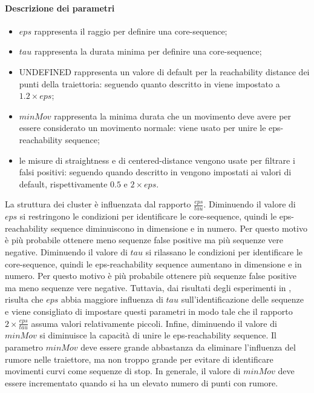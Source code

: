 \documentclass[12pt]{article}
\begin{document}
\paragraph{Descrizione dei parametri}
\begin{itemize}
    \item $eps$ rappresenta il raggio per definire una core-sequence;
    \item $tau$ rappresenta la durata minima per definire una core-sequence;
    \item UNDEFINED rappresenta un valore di default per la reachability distance dei punti della traiettoria: seguendo quanto descritto in \cite{SequenceClustering} viene impostato a $1.2\times eps$;
    \item $minMov$ rappresenta la minima durata che un movimento deve avere per essere considerato un movimento normale: viene usato per unire le eps-reachability sequence;
    \item le misure di straightness e di centered-distance vengono usate per filtrare i falsi positivi: seguendo quando descritto in \cite{SequenceClustering} vengono impostati ai valori di default, rispettivamente $0.5$ e $2\times eps$.
\end{itemize}
La struttura dei cluster è influenzata dal rapporto $\frac{eps}{tau}$.
Diminuendo il valore di $eps$ si restringono le condizioni per identificare le core-sequence, quindi le eps-reachability sequence diminuiscono in dimensione e in numero.
Per questo motivo è più probabile ottenere meno sequenze false positive ma più sequenze vere negative.
Diminuendo il valore di $tau$ si rilassano le condizioni per identificare le core-sequence, quindi  le eps-reachability sequence aumentano in dimensione e in numero.
Per questo motivo è più probabile ottenere più sequenze false positive ma meno sequenze vere negative.
Tuttavia, dai risultati degli esperimenti in \cite{SequenceClustering}, risulta che $eps$ abbia maggiore influenza di $tau$ sull'identificazione delle sequenze e viene consigliato di impostare questi parametri in modo tale che il rapporto $2\times \frac{eps}{tau}$ assuma valori relativamente piccoli.
Infine, diminuendo il valore di $minMov$ si diminuisce la capacità di unire le eps-reachability sequence.
Il parametro $minMov$ deve essere grande abbastanza da eliminare l'influenza del rumore nelle traiettore, ma non troppo grande per evitare di identificare movimenti curvi come sequenze di stop. In generale, il valore di $minMov$ deve essere incrementato quando si ha un elevato numero di punti con rumore.
\end{document}
